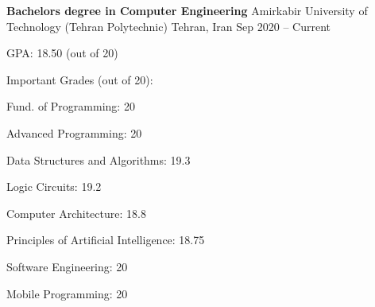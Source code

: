 \documentclass[]{awesome-cv}
\begin{document}
\begin{cventries}
	\cventry
	{\textbf{Bachelor\textquotesingle{}s degree in Computer Engineering}}
	{Amirkabir University of Technology (Tehran Polytechnic)}
	{Tehran, Iran}
	{Sep 2020 – Current}
	{\begin{cvitems}
		\vspace{1mm}
		\item[] {\hspace{-9mm} GPA: 18.50 (out of 20)}
		\vspace{1mm}
		\item[] {\hspace{-9mm} Important Grades (out of 20):}
		\vspace{1mm}
		\item {Fund. of Programming: 20}
		\item {Advanced Programming: 20}
		\item {Data Structures and Algorithms: 19.3}
		\item {Logic Circuits: 19.2}
		\item {Computer Architecture: 18.8}
		\item {Principles of Artificial Intelligence: 18.75}
		\item {Software Engineering: 20}
		\item {Mobile Programming: 20}
	\end{cvitems}}
\end{cventries}
\vspace{-2mm}
\end{document}
